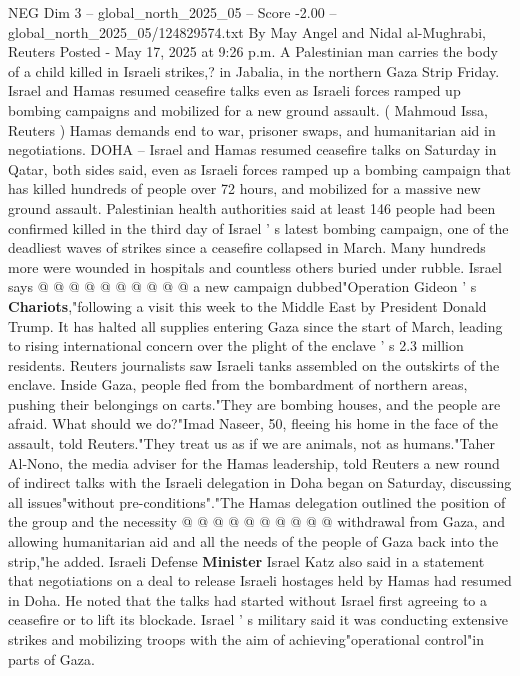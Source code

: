 \begin{textsample}{NEG Dim 3 – global\_north\_2025\_05 – Score -2.00 – global\_north\_2025\_05/124829574.txt}  \label{ex:f3_neg_309}
By May Angel and Nidal al-Mughrabi, Reuters Posted - May 17, 2025 at 9:26 p.m.
A Palestinian man carries the body of a child killed in Israeli strikes,? in Jabalia, in the northern Gaza Strip Friday.
Israel and Hamas resumed ceasefire talks even as Israeli forces ramped up bombing campaigns and mobilized for a new ground assault. ( Mahmoud Issa, Reuters ) Hamas demands end to war, prisoner swaps, and humanitarian aid in negotiations.
DOHA -- Israel and Hamas resumed ceasefire talks on Saturday in Qatar, both sides said, even as Israeli forces ramped up a bombing campaign that has killed hundreds of people over 72 hours, and mobilized for a massive new ground assault.
Palestinian health authorities said at least 146 people had been confirmed killed in the third day of Israel ' s latest bombing campaign, one of the deadliest waves of strikes since a ceasefire collapsed in March.
Many hundreds more were wounded in hospitals and countless others buried under rubble.
Israel says @ @ @ @ @ @ @ @ @ @ a new campaign dubbed"Operation Gideon ' s \textbf{Chariots},"following a visit this week to the Middle East by President Donald Trump.
It has halted all supplies entering Gaza since the start of March, leading to rising international concern over the plight of the enclave ' s 2.3 million residents.
Reuters journalists saw Israeli tanks assembled on the outskirts of the enclave.
Inside Gaza, people fled from the bombardment of northern areas, pushing their belongings on carts."They are bombing houses, and the people are afraid.
What should we do?"Imad Naseer, 50, fleeing his home in the face of the assault, told Reuters."They treat us as if we are animals, not as humans."Taher Al-Nono, the media adviser for the Hamas leadership, told Reuters a new round of indirect talks with the Israeli delegation in Doha began on Saturday, discussing all issues"without pre-conditions"."The Hamas delegation outlined the position of the group and the necessity @ @ @ @ @ @ @ @ @ @ withdrawal from Gaza, and allowing humanitarian aid and all the needs of the people of Gaza back into the strip,"he added.
Israeli Defense \textbf{Minister} Israel Katz also said in a statement that negotiations on a deal to release Israeli hostages held by Hamas had resumed in Doha.
He noted that the talks had started without Israel first agreeing to a ceasefire or to lift its blockade.
Israel ' s military said it was conducting extensive strikes and mobilizing troops with the aim of achieving"operational control"in parts of Gaza.

\end{textsample}
